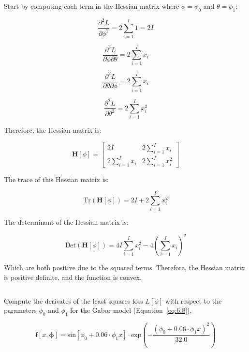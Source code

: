 \documentclass[12pt]{report}
\begin{document}
Start by computing each term in the Hessian matrix where $\phi = \phi_{0}$ and $\theta = \phi_{1}$:

\begin{equation*}
    \frac{\partial^2 L}{\partial \phi^2} = 2\sum_{i=1}^{I} 1 = 2I
\end{equation*}

\begin{equation*}
    \frac{\partial^2 L}{\partial \phi \partial \theta} = 2\sum_{i=1}^{I}x_{i}
\end{equation*}

\begin{equation*}
    \frac{\partial^2 L}{\partial \theta \partial \phi} = 2\sum_{i=1}^{I}x_{i}
\end{equation*}

\begin{equation*}
    \frac{\partial^2 L}{\partial \theta^2} = 2\sum_{i=1}^{I}x_{i}^2
\end{equation*}

Therefore, the Hessian matrix is:

\begin{equation*}
    \mathbf{H}[\phi] = \left[\begin{matrix}
            2I                   & 2\sum_{i=1}^{I}x_{i}   \\
            2\sum_{i=1}^{I}x_{i} & 2\sum_{i=1}^{I}x_{i}^2
        \end{matrix}\right]
\end{equation*}

The trace of this Hessian matrix is:

\begin{equation*}
    \text{Tr}(\mathbf{H}[\phi]) = 2I + 2\sum_{i=1}^{I}x_{i}^2
\end{equation*}

The determinant of the Hessian matrix is:

\begin{equation*}
    \text{Det}(\mathbf{H}[\phi]) = 4I\sum_{i=1}^{I}x_{i}^2 - 4\left(\sum_{i=1}^{I}x_{i}\right)^2
\end{equation*}

Which are both positive due to the squared terms. Therefore, the Hessian matrix is positive definite, and the function is convex.

\subsection{}
\begin{mdframed}
    Compute the derivates of the least squares loss $L[\phi]$ with respect to the parameters $\phi_{0}$ and $\phi_{1}$ for the Gabor model (Equation~\ref{eq:6.8}),

    \begin{equation}
        \text{f}[x, \boldsymbol{\phi}] = \text{sin}[\phi_{0} + 0.06\cdot\phi_{1}x]\cdot\text{exp}\left(-\frac{(\phi_{0} + 0.06\cdot\phi_{1}x)^{2}}{32.0}\right)
        \tag{6.8}
        \label{eq:6.8}
    \end{equation}
\end{mdframed}
\end{document}
